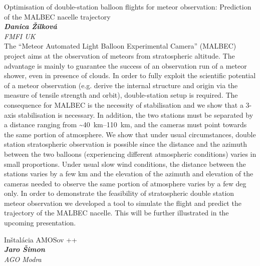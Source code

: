 \documentclass[a4paper]{report}
\begin{document}
                    \begin{tcolorbox}[
                                    colback=white,
                    colframe=black!70!white,
                                fonttitle=\Large\bfseries,
                title=14:00
            ]
                {\Large Optimisation of double-station balloon flights for meteor observation: Prediction of the MALBEC nacelle trajectory}
                                                            \\ \textbf{\textit{Danica Žilková}}
                                                    \\ \textit{FMFI UK}                \\[2ex]The “Meteor Automated Light Balloon Experimental Camera” (MALBEC) project aims at the observation of meteors from stratospheric altitude. The advantage is mainly to guarantee the success of an observation run of a meteor shower, even in presence of clouds. In order to fully exploit the scientific potential of a meteor observation (e.g. derive the internal structure and origin via the measure of tensile strength and orbit), double-station setup is required. The consequence for MALBEC is the necessity of stabilisation and we show that a 3-axis stabilisation is necessary. In addition, the two stations must be separated by a distance ranging from \textasciitilde\SIrange{40}{110}{\kilo\metre}, and the cameras must point towards the same portion of atmosphere. We show that under usual circumstances, double station stratospheric observation is possible since the distance and the azimuth between the two balloons (experiencing different atmospheric conditions) varies in small proportions. Under usual slow wind conditions, the distance between the stations varies by a few km and the elevation of the azimuth and elevation of the cameras needed to observe the same portion of atmosphere varies by a few deg only. In order to demonstrate the feasibility of stratospheric double station meteor observation we developed a tool to simulate the flight and predict the trajectory of the MALBEC nacelle. This will be further illustrated in the upcoming presentation.
            \end{tcolorbox}
                    \begin{tcolorbox}[
                                    colback=white,
                    colframe=black!70!white,
                                fonttitle=\Large\bfseries,
                title=15:00
            ]
                {\Large Inštalácia AMOSov ++}
                                                            \\ \textbf{\textit{Jaro Šimon}}
                                                    \\ \textit{AGO Modra}                            \end{tcolorbox}
\end{document}
